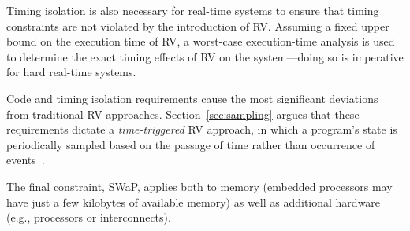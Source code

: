 Timing isolation is also necessary for real-time systems to ensure that timing
constraints are not violated by the introduction of RV.  Assuming a fixed upper
bound on the execution time of RV, a worst-case execution-time analysis is used
to determine the exact timing effects of RV on the system---doing so is
imperative for hard real-time systems.

Code and timing isolation requirements cause the most significant deviations from
traditional RV approaches.  Section~\ref{sec:sampling}  argues 
that these requirements dictate a \emph{time-triggered} RV approach, in which a program's state is
periodically sampled based on the passage of time rather than occurrence of
events~\cite{copilot}.

The final constraint, SWaP, applies both to memory (embedded processors may have
just a few kilobytes of available memory) as well as additional hardware (e.g.,
processors or interconnects).










